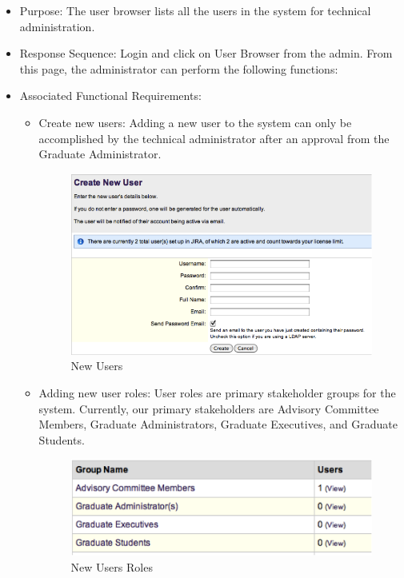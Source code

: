 \documentclass[11pt,a4paper]{report}
\begin{document}
\begin{itemize}
\item Purpose: The user browser lists all the users in the system for technical administration. 
\item Response Sequence: Login and click on User Browser from the admin. From this page, the administrator can perform the following functions:
\item Associated Functional Requirements:
\begin{itemize}
\item Create new users: Adding a new user to the system can only be accomplished by the technical administrator after an approval from the Graduate Administrator.
\begin{figure}[htp]
\centering
\includegraphics[scale=1]{diagrams/HTMLTemplating/Figure8.png}
\caption{New Users}
\label{fig:NewUser}
\end{figure}
\item Adding new user roles: User roles are primary stakeholder groups for the system. Currently, our primary stakeholders are Advisory Committee Members, Graduate Administrators, Graduate Executives, and Graduate Students.
\begin{figure}[htp]
\centering
\includegraphics[scale=1]{diagrams/HTMLTemplating/Figure9.png}
\caption{New Users Roles}
\label{fig:NewUserRoles}
\end{figure}


\end{itemize}
\end{itemize}
\end{document}
